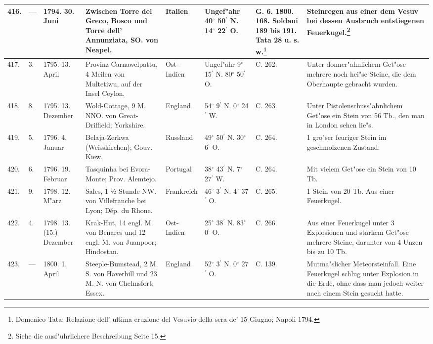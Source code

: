 \documentclass[a4paper, 8pt, oneside, polutonikogreek, german]{article}
\begin{document}
\begin{center}
\begin{longtable}{| p{5mm} | p{3mm} | p{15mm} | p{25mm} | p{20mm} | p{14mm} | p{17mm} | p{24mm} |}
        416. & --- & 1794. 30. Juni & Zwischen Torre del Greco, Bosco und Torre dell’ Annunziata, SO. von Neapel. & Italien & Ungef"ahr 40$^\circ$ 50$^\prime$ N. 14$^\circ$ 22$^\prime$ O. & G. 6. 1800. 168. Soldani 189 bis 191. Tata 28 u. s. w.\footnote{Domenico Tata: Relazione dell' ultima eruzione del Vesuvio della sera de' 15 Giugno; Napoli 1794.} & Steinregen aus einer dem Vesuv bei dessen Ausbruch entstiegenen Feuerkugel.\footnote{Siehe die ausf"uhrlichere Beschreibung Seite 15.} \\ \hline
        417. & 3. & 1795. 13. April & Provinz Carnawelpattu, 4 Meilen von Multetiwu, auf der Insel Ceylon. & Ost-Indien & Ungef"ahr 9$^\circ$ 15$^\prime$ N. 80$^\circ$ 50$^\prime$ O. & C. 262. & Unter donner"ahnlichem Get"ose mehrere noch hei"se Steine, die dem Oberhaupte gebracht wurden. \\ \hline
        418. & 8. & 1795. 13. Dezember & Wold-Cottage, 9 M. NNO. von Great-Driffield; Yorkshire. & England & 54$^\circ$ 9$^\prime$ N. 0$^\circ$ 24$^\prime$ W. & C. 263. & Unter Pistolenschuss"ahnlichem Get"ose ein Stein von 56 Tb., den man in London sehen lie"s. \\ \hline
        419. & 5. & 1796. 4. Januar & Belaja-Zerkwa (Weisskirchen); Gouv. Kiew. & Russland & 49$^\circ$ 50$^\prime$ N. 30$^\circ$ 6$^\prime$ O. & C. 264. & 1 gro"ser feuriger Stein im geschmolzenen Zustand. \\ \hline
        420. & 6. & 1796. 19. Februar & Tasquinha bei Evora-Monte; Prov. Alemtejo. & Portugal & 38$^\circ$ 43$^\prime$ N. 7$^\circ$ 27$^\prime$ W. & C. 264. & Mit vielem Get"ose ein Stein von 10 Tb. \\ \hline
        421. & 9. & 1798. 12. M"arz & Sales, 1 ½ Stunde NW. von Villefranche bei Lyon; Dép. du Rhone. & Frankreich & 46$^\circ$ 3$^\prime$ N. 4$^\circ$ 37$^\prime$ O. & C. 265. & 1 Stein von 20 Tb. Aus einer Feuerkugel. \\ \hline
        422. & 4. & 1798. 13. (15.) Dezember & Krak-Hut, 14 engl. M. von Benares und 12 engl. M. von Juanpoor; Hindostan. & Ost-Indien & 25$^\circ$ 38$^\prime$ N. 83$^\circ$ 0$^\prime$ O. & C. 266. & Aus einer Feuerkugel unter 3 Explosionen und starkem Get"ose mehrere Steine, darunter von 4 Unzen bis zu 10 Tb. \\ \hline
        423. & --- & 1800. 1. April & Steeple-Bumstead, 2 M. S. von Haverhill und 23 M. N. von Chelmsfort; Essex. & England & 52$^\circ$ 3$^\prime$ N. 0$^\circ$ 27$^\prime$ O. & C. 139. & Mutma"slicher Meteorsteinfall. Eine Feuerkugel schlug unter Explosion in die Erde, ohne dass man jedoch weiter nach einem Stein gesucht hatte. \\ \hline

\end{longtable}
\end{center}
\end{document}
